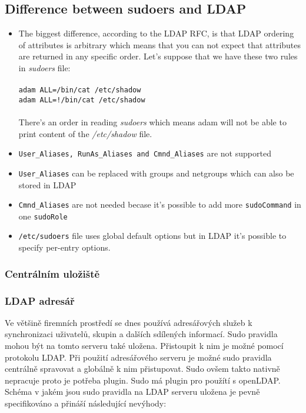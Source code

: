 \documentclass[12pt,a4paper,titlepage,final]{article}
\begin{document}
\subsection{Difference between sudoers and LDAP}
\begin{itemize} 
	\item The biggest difference, according to the LDAP RFC, is that LDAP ordering
		of attributes is arbitrary which means that you can not expect that
		attributes are returned in any specific order. 
		Let's suppose that we have these two rules in \emph{sudoers} file:
		\\\\\quad
		\texttt{adam ALL=/bin/cat /etc/shadow}\\
		\texttt{adam ALL=!/bin/cat /etc/shadow}\\
		\\
		There's an order in reading \emph{sudoers} which means adam will not be able
		to print content of the \emph{/etc/shadow} file.
	\item \texttt{User\_Aliases, RunAs\_Aliases and Cmnd\_Aliases} are not supported
	\item \texttt{User\_Aliases} can be replaced with groups and netgroups which can
		also be stored in LDAP
	\item \texttt{Cmnd\_Aliases} are not needed becase it's possible to add more
		\texttt{sudoCommand} in one \texttt{sudoRole}
	\item \texttt{/etc/sudoers} file uses global default options but in LDAP it's
		possible to specify per-entry options.
\end{itemize}



\subsubsection{Centrálním uložiště}

\subsubsection{LDAP adresář}
Ve většině firemních prostředí se dnes používá adresářových služeb k
synchronizaci uživatelů, skupin a dalších sdílených informací. Sudo pravidla
mohou být na tomto serveru také uložena.  Přistoupit k nim je možné pomocí
protokolu LDAP. Při
použití adresářového serveru je možné sudo
pravidla centrálně spravovat a globálně k nim přistupovat. Sudo ovšem takto
nativně nepracuje proto je potřeba plugin. Sudo má plugin pro použítí s
openLDAP. Schéma v jakém jsou sudo pravidla na LDAP serveru uložena je pevně
specifikováno a přináší následující nevýhody: 
\end{document}
